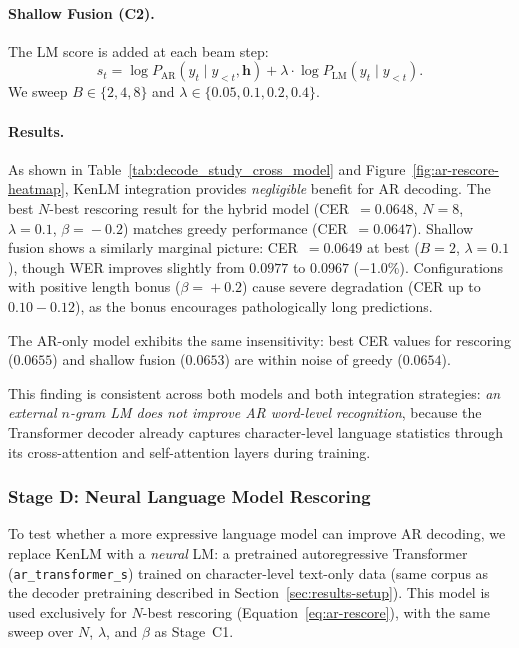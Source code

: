 \paragraph{Shallow Fusion (C2).}
The LM score is added at each beam step:
\begin{equation}
    s_t = \log P_\text{AR}(y_t \mid y_{<t}, \mathbf{h}) + \lambda \cdot \log P_\text{LM}(y_t \mid y_{<t}).
    \label{eq:ar-shallow}
\end{equation}
We sweep $B \in \{2, 4, 8\}$ and $\lambda \in \{0.05, 0.1, 0.2, 0.4\}$.

\paragraph{Results.}
As shown in Table~\ref{tab:decode_study_cross_model} and Figure~\ref{fig:ar-rescore-heatmap}, KenLM integration provides \emph{negligible} benefit for AR decoding.
The best $N$-best rescoring result for the hybrid model (CER~$=0.0648$, $N\!=\!8$, $\lambda\!=\!0.1$, $\beta\!=\!-0.2$) matches greedy performance (CER~$=0.0647$).
Shallow fusion shows a similarly marginal picture: CER~$=0.0649$ at best ($B\!=\!2$, $\lambda\!=\!0.1$), though WER improves slightly from $0.0977$ to $0.0967$ ($-$1.0\%).
Configurations with positive length bonus ($\beta\!=\!+0.2$) cause severe degradation (CER up to $0.10{-}0.12$), as the bonus encourages pathologically long predictions.

The AR-only model exhibits the same insensitivity: best CER values for rescoring ($0.0655$) and shallow fusion ($0.0653$) are within noise of greedy ($0.0654$).

This finding is consistent across both models and both integration strategies:
\emph{an external $n$-gram LM does not improve AR word-level recognition}, because the Transformer decoder already captures character-level language statistics through its cross-attention and self-attention layers during training.


\subsubsection{Stage D: Neural Language Model Rescoring}
\label{sec:decode-stage-d}

To test whether a more expressive language model can improve AR decoding,
we replace KenLM with a \emph{neural} LM: a pretrained autoregressive Transformer
(\texttt{ar\_transformer\_s}) trained on character-level text-only data (same corpus
as the decoder pretraining described in Section~\ref{sec:results-setup}).
This model is used exclusively for $N$-best rescoring (Equation~\ref{eq:ar-rescore}),
with the same sweep over $N$, $\lambda$, and $\beta$ as Stage~C1.

